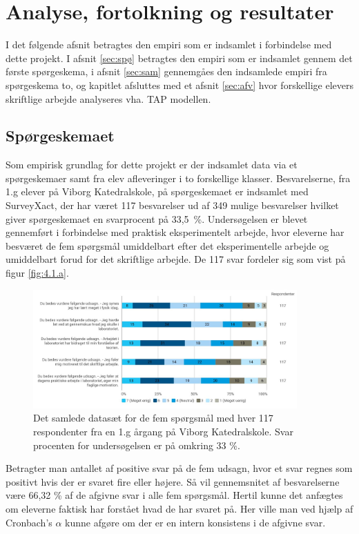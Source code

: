 \chapter{Analyse, fortolkning og resultater}
\label{Ch:4}

I det følgende afsnit betragtes den empiri som er indsamlet i forbindelse med dette projekt.  I afsnit \vref{sec:spø} betragtes den empiri som er indsamlet gennem det første spørgeskema, i afsnit \vref{sec:sam} gennemgåes den indsamlede empiri fra spørgeskema to, og kapitlet afsluttes med et afsnit \vref{sec:afv} hvor forskellige elevers skriftlige arbejde analyseres vha. TAP modellen.

\section{Spørgeskemaet}
\label{sec:spø}
Som empirisk grundlag for dette projekt er der indsamlet data via et spørgeskemaer samt fra elev afleveringer i to forskellige klasser. Besvarelserne, fra 1.g elever på Viborg Katedralskole, på spørgeskemaet er indsamlet med SurveyXact, der har været 117 besvarelser ud af 349 mulige besvarelser hvilket giver spørgeskemaet en svarprocent på \mbox{33,5 \%}. Undersøgelsen er blevet gennemført i forbindelse med praktisk eksperimentelt arbejde, hvor eleverne har besværet de fem spørgsmål umiddelbart efter det eksperimentelle arbejde og umiddelbart forud for det skriftlige arbejde. De 117 svar fordeler sig som vist på figur \vref{fig:4.1.a}. 

\begin{figure}[h!]
	\centering
	\includegraphics[width=0.9\textwidth]{Figs/Sammenlign}
	\caption[Spørgeskema resultater]{Det samlede datasæt for de fem spørgsmål med hver 117 respondenter fra en 1.g årgang på Viborg Katedralskole. Svar procenten for undersøgelsen er på omkring 33 \%. }
	\label{fig:4.1.a}
\end{figure}
Betragter man antallet af positive svar på de fem udsagn, hvor et svar regnes som positivt hvis der er svaret fire eller højere. Så vil gennemsnitet af besvarelserne være 66,32 \% af de afgivne svar i alle fem spørgsmål.  Hertil kunne det anfægtes om eleverne faktisk har forstået hvad de har svaret på. Her ville man ved hjælp af Cronbach's $\alpha$ kunne afgøre om der er en intern konsistens i de afgivne svar.

